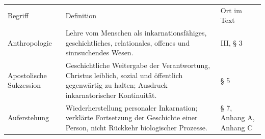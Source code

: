 \documentclass[
  ngerman,
]{article}
\begin{document}
\begin{longtable}[]{@{}
  >{\raggedright\arraybackslash}p{}
  >{\raggedright\arraybackslash}p{}
  >{\raggedright\arraybackslash}p{}@{}}
\toprule\noalign{}
\begin{minipage}[b]{\linewidth}\raggedright
Begriff
\end{minipage} & \begin{minipage}[b]{\linewidth}\raggedright
Definition
\end{minipage} & \begin{minipage}[b]{\linewidth}\raggedright
Ort im Text
\end{minipage} \\
\begin{minipage}[b]{\linewidth}\raggedright
Anthropologie
\end{minipage} & \begin{minipage}[b]{\linewidth}\raggedright
Lehre vom Menschen als inkarnationsfähiges, geschichtliches,
relationales, offenes und sinnsuchendes Wesen.
\end{minipage} & \begin{minipage}[b]{\linewidth}\raggedright
III, § 3
\end{minipage} \\
\begin{minipage}[b]{\linewidth}\raggedright
Apostolische Sukzession
\end{minipage} & \begin{minipage}[b]{\linewidth}\raggedright
Geschichtliche Weitergabe der Verantwortung, Christus leiblich, sozial
und öffentlich gegenwärtig zu halten; Ausdruck inkarnatorischer
Kontinuität.
\end{minipage} & \begin{minipage}[b]{\linewidth}\raggedright
§ 5
\end{minipage} \\
\begin{minipage}[b]{\linewidth}\raggedright
Auferstehung
\end{minipage} & \begin{minipage}[b]{\linewidth}\raggedright
Wiederherstellung personaler Inkarnation; verklärte Fortsetzung der
Geschichte einer Person, nicht Rückkehr biologischer Prozesse.
\end{minipage} & \begin{minipage}[b]{\linewidth}\raggedright
§ 7, Anhang A, Anhang C
\end{minipage} \\

\end{longtable}
\end{document}
